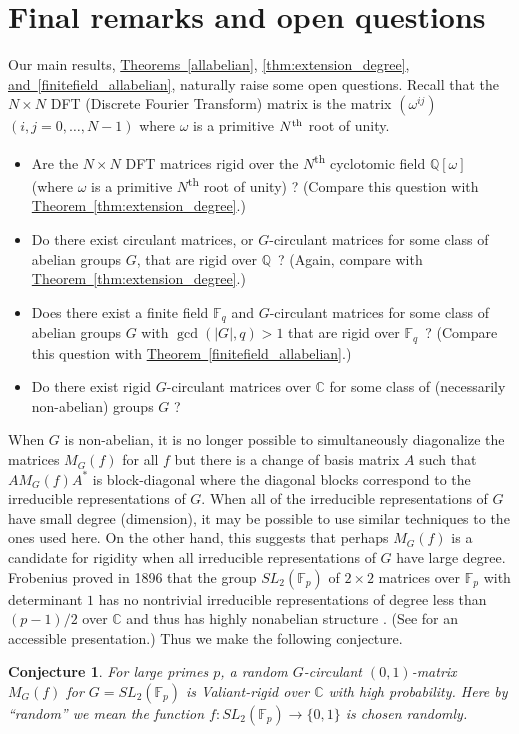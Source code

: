 \documentclass[11pt]{article}
\numberwithin{equation}{section}
\newtheorem{conjecture}[theorem]{Conjecture}
\theoremstyle{definition}
\theoremstyle{plain}
\newcommand{\C}{\mathbb C}
\newcommand{\Q}{\mathbb Q}
\newcommand{\expref}[2]{\hyperref[#2]{#1~\ref{#2}}}
\theoremstyle{definition}
\newcommand\F{{\mathbb{F}}}
\renewcommand\Q{{\mathbb{Q}}}
\renewcommand\C{{\mathbb{C}}}
\newcommand{\ts}{\textsuperscript}
\begin{document}
%
\section{Final remarks and open questions}
\label{sec_conclusion} 
Our main results,
%
%
\expref{Theorems}{allabelian}, \ref{thm:extension_degree},
\expref{and}{finitefield_allabelian},
naturally raise
%
some     %
open questions.
%
Recall that the $N\times N$ DFT (Discrete Fourier Transform)
matrix is the matrix $(\omega^{ij})$ $(i,j=0,\dots, N-1)$
where $\omega$ is a primitive $N\ts{th}$ root of unity.
\begin{itemize}
\item Are the $N \times N$ DFT matrices rigid over
  the $N$\ts{th} cyclotomic field $\Q[\omega]$
  (where $\omega$ is a primitive $N$\ts{th} root of unity) ?
  (Compare this question with \expref{Theorem}{thm:extension_degree}.)
%
%
%
%
\item Do there exist circulant matrices, or $G$-circulant matrices for
   some class of abelian groups $G$, that are rigid over $\Q$\, ? 
  (Again, compare with \expref{Theorem}{thm:extension_degree}.)
\item Does there exist a finite field $\F_q$ and $G$-circulant matrices for
   some class of abelian groups $G$ with $\gcd(|G|, q ) > 1$ that are rigid over $\F_q$\, ? 
  (Compare this question with \expref{Theorem}{finitefield_allabelian}.)
\item Do there exist rigid $G$-circulant matrices over $\C$ 
  for some class of (necessarily non-abelian) groups $G$ ?
\end{itemize}

When $G$ is non-abelian, it is no longer possible to simultaneously 
diagonalize the matrices $M_G(f)$ for all $f$  
but there is a change of basis matrix $A$ such that $AM_G(f)A^*$
is block-diagonal where the diagonal blocks correspond to the irreducible
representations of $G$.  When all of the irreducible representations of $G$
have small degree (dimension),  
it may be possible to use similar techniques to the ones used here.
On the other hand, this suggests that perhaps $M_G(f)$ is a candidate
for rigidity when all irreducible representations of $G$
have large degree.  Frobenius proved in 1896 
that the group $SL_2(\F_p)$ of $2 \times 2$ matrices over $\F_p$ with
determinant $1$ has no nontrivial irreducible representations
of degree less than $(p-1)/2$ over $\C$ 
and thus has highly nonabelian structure \cite{frobenius1896}.
%
(See \cite{davidoff} for an accessible presentation.)  %
Thus we make the following conjecture. %
%
%
%
%
%
%
%
%
%
\begin{conjecture}
For large primes $p$, a random $G$-circulant $(0,1)$-matrix
$M_G(f)$ for $G = SL_2(\F_p)$ is Valiant-rigid over $\C$ with
high probability.  Here by ``random'' we mean the function
$f:SL_2(\F_p) \rightarrow \{0,1\}$ is chosen randomly.
\end{conjecture}
\end{document}
